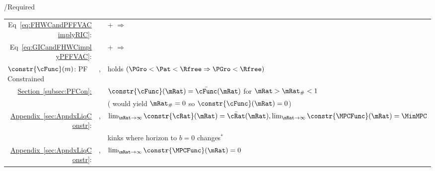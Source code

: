 \documentclass[\econtexRoot/BufferStockTheory]{subfiles}
\begin{document}
\begin{verbatimwrite}{\TableDir/Required}
\begin{table}
{\begin{tabular}{|l|l|l|}
    \\ \multicolumn{1}{|r|}{Eq~\eqref{eq:FHWCandPFFVACimplyRIC}:}                                                                              &                                         & {\PFFVAC}+{\FHWC} $\Rightarrow$ {\RIC}         
    \\ \multicolumn{1}{|r|}{{Eq~\eqref{eq:GICandFHWCimplyPFFVAC}}:}                                                                              &                                         & {\GIC}+{\FHWC} $\Rightarrow$ {\PFFVAC}         
    \\ \hline\hline \multicolumn{1}{|l|}{$\constr{\cFunc}(m)$: PF Constrained}                                              & \cncl{\GICRaw}, \RIC                    & {\FHWC} holds $(\PGro < \Pat < \Rfree \Rightarrow \PGro < \Rfree)$
    \\
\multicolumn{1}{|r|}{\href{https://\owner.github.io/BufferStockTheory\#PF-Constrained-Solution}{Section~\ref{subsec:PFCon}:}}                &                                         & $\constr{\cFunc}(\mRat)=\bar{\cFunc}(\mRat)$ for $\mRat > \mRat_{\#} < 1$
    \\                                                                                                                        &                                         & (\cncl{\RIC} would yield $\mRat_{\#}=0$ so $\constr{\cFunc}(\mRat)=0$)
    \\ \cline{2-3}  \multicolumn{1}{|r|}{\href{https://\owner.github.io/BufferStockTheory\#ApndxLiqConstr}{Appendix~\ref{sec:ApndxLiqConstr}}:} & \GICRaw,\RIC                            & $\lim_{\mRat \rightarrow \infty} \constr{\cRat}(\mRat)=\bar{\cRat}(\mRat), \lim_{\mRat \rightarrow \infty} \constr{\MPCFunc}(\mRat)=\MinMPC$                                                                                                                                                                       
    \\                                                                                                                        &                                         & kinks where horizon to $b=0$ changes$^{\ast}$
    \\ \cline{2-3}\multicolumn{1}{|r|}{\href{https://\owner.github.io/BufferStockTheory\#ApndxLiqConstr}{Appendix~\ref{sec:ApndxLiqConstr}}:}  & \GICRaw,\cncl{\RIC}                     & $\lim_{\mRat \rightarrow \infty}  \constr{\MPCFunc}(\mRat)=0$

\end{tabular}}
\end{table}
\end{verbatimwrite}
\end{document}
